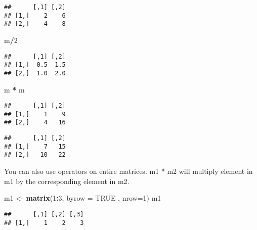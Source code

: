 \documentclass[
]{article}
\newenvironment{Shaded}{\begin{snugshade}}{\end{snugshade}}
\newcommand{\DataTypeTok}[1]{\textcolor[rgb]{0.13,0.29,0.53}{#1}}
\newcommand{\DecValTok}[1]{\textcolor[rgb]{0.00,0.00,0.81}{#1}}
\newcommand{\KeywordTok}[1]{\textcolor[rgb]{0.13,0.29,0.53}{\textbf{#1}}}
\newcommand{\NormalTok}[1]{#1}
\newcommand{\OperatorTok}[1]{\textcolor[rgb]{0.81,0.36,0.00}{\textbf{#1}}}
\newcommand{\OtherTok}[1]{\textcolor[rgb]{0.56,0.35,0.01}{#1}}
\newcommand{\StringTok}[1]{\textcolor[rgb]{0.31,0.60,0.02}{#1}}
\begin{document}
\begin{verbatim}
##      [,1] [,2]
## [1,]    2    6
## [2,]    4    8
\end{verbatim}

\begin{Shaded}
\begin{Highlighting}[]
\NormalTok{m}\OperatorTok{/}\DecValTok{2}
\end{Highlighting}
\end{Shaded}

\begin{verbatim}
##      [,1] [,2]
## [1,]  0.5  1.5
## [2,]  1.0  2.0
\end{verbatim}

\begin{Shaded}
\begin{Highlighting}[]
\NormalTok{m }\OperatorTok{*}\StringTok{ }\NormalTok{m}
\end{Highlighting}
\end{Shaded}

\begin{verbatim}
##      [,1] [,2]
## [1,]    1    9
## [2,]    4   16
\end{verbatim}

\begin{Shaded}
\end{Shaded}

\begin{verbatim}
##      [,1] [,2]
## [1,]    7   15
## [2,]   10   22
\end{verbatim}

You can also use operators on entire matrices. m1 * m2 will multiply
element in m1 by the corresponding element in m2.

\begin{Shaded}
\begin{Highlighting}[]
\NormalTok{m1 <-}\StringTok{ }\KeywordTok{matrix}\NormalTok{(}\DecValTok{1}\OperatorTok{:}\DecValTok{3}\NormalTok{, }\DataTypeTok{byrow =} \OtherTok{TRUE}\NormalTok{ , }\DataTypeTok{nrow=}\DecValTok{1}\NormalTok{)}
\NormalTok{m1}
\end{Highlighting}
\end{Shaded}

\begin{verbatim}
##      [,1] [,2] [,3]
## [1,]    1    2    3
\end{verbatim}
\end{document}
